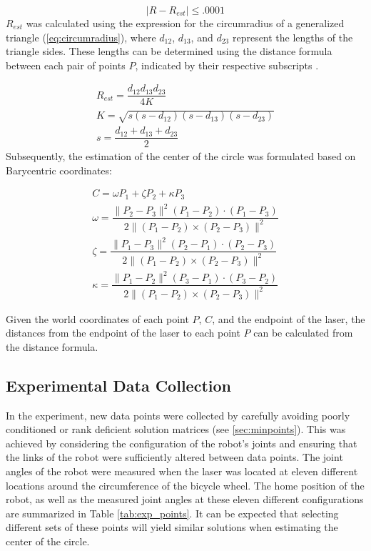 \documentclass[12pt]{article}
\begin{document}
\begin{equation}
	\left|R-R_{est}\right| \leq .0001
    \label{eq:radius_constraint}
\end{equation}
\noindent
$R_{est}$ was calculated using the expression for the circumradius of a generalized triangle (\ref{eq:circumradius}), where $d_{12}$, $d_{13}$, and $d_{23}$ represent the lengths of the triangle sides.  These lengths can be determined using the distance formula between each pair of points $P$, indicated by their respective subscripts \cite{Weisstein}.


\begin{equation}
\begin{aligned}
	R_{est} = \dfrac{d_{12}d_{13}d_{23}}{4K}\\
	K = \sqrt{s(s-d_{12})(s-d_{13})(s-d_{23})}\\
	s = \dfrac{d_{12}+d_{13}+d_{23}}{2}
    \label{eq:circumradius}
\end{aligned}
\end{equation} 
\noindent
Subsequently, the estimation of the center of the circle was formulated based on Barycentric \cite{WHE} coordinates:

\begin{equation}
\begin{aligned}
	C = \omega P_1 + \zeta P_2 + \kappa P_3\\
    \omega = \dfrac{\|P_2-P_3\|^2(P_1-P_2)\cdot(P_1-P_3)}{2\|(P_1-P_2)\times(P_2-P_3)\|^2}\\
    \zeta = \dfrac{\|P_1-P_3\|^2(P_2-P_1)\cdot(P_2-P_3)}{2\|(P_1-P_2)\times(P_2-P_3)\|^2}\\
    \kappa = \dfrac{\|P_1-P_2\|^2(P_3-P_1)\cdot(P_3-P_2)}{2\|(P_1-P_2)\times(P_2-P_3)\|^2}
    \label{eq:circle_center}
\end{aligned}
\end{equation}

\noindent
Given the world coordinates of each point $P$, $C$, and the endpoint of the laser, the distances from the endpoint of the laser to each point $P$ can be calculated from the distance formula. 
\noindent


\subsection{Experimental Data Collection}
In the experiment, new data points were collected by carefully avoiding poorly conditioned or rank deficient solution matrices (see \ref{sec:minpoints}). This was achieved by considering the configuration of the robot's joints and ensuring that the links of the robot were sufficiently altered between data points. The joint angles of the robot were measured when the laser was located at eleven different locations around the circumference of the bicycle wheel. The home position of the robot, as well as the measured joint angles at these eleven different configurations are summarized in Table \ref{tab:exp_points}. It can be expected that selecting different sets of these points will yield similar solutions when estimating the center of the circle. 
\end{document}
